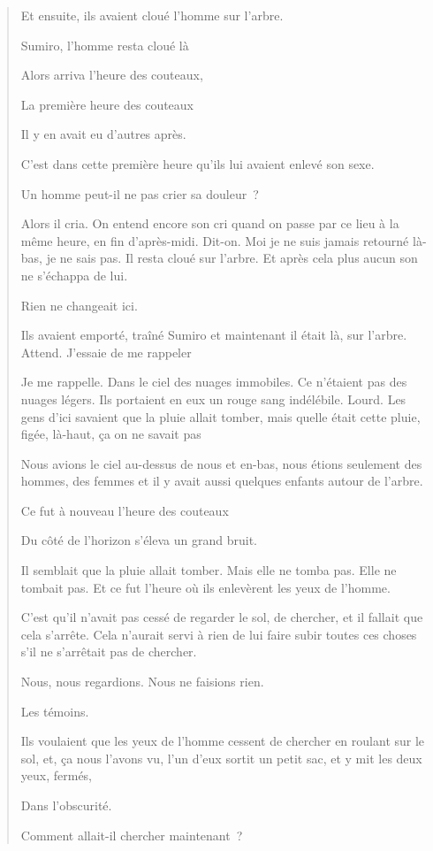 \begin{quote}
Et ensuite, ils avaient cloué l'homme sur l'arbre.

Sumiro, l'homme resta cloué là

Alors arriva l'heure des couteaux,

La première heure des couteaux

Il y en avait eu d'autres après.

C'est dans cette première heure qu'ils lui avaient enlevé son sexe.

Un homme peut-il ne pas crier sa douleur~?

Alors il cria. On entend encore son cri quand on passe par ce lieu à la
même heure, en fin d'après-midi. Dit-on. Moi je ne suis jamais retourné
là-bas, je ne sais pas. Il resta cloué sur l'arbre. Et après cela plus
aucun son ne s'échappa de lui.

Rien ne changeait ici.

Ils avaient emporté, traîné Sumiro et maintenant il était là, sur
l'arbre. Attend. J'essaie de me rappeler

Je me rappelle. Dans le ciel des nuages immobiles. Ce n'étaient pas des
nuages légers. Ils portaient en eux un rouge sang indélébile. Lourd. Les
gens d'ici savaient que la pluie allait tomber, mais quelle était cette
pluie, figée, là-haut, ça on ne savait pas

Nous avions le ciel au-dessus de nous et en-bas, nous étions seulement
des hommes, des femmes et il y avait aussi quelques enfants autour de
l'arbre.

Ce fut à nouveau l'heure des couteaux

Du côté de l'horizon s'éleva un grand bruit.

Il semblait que la pluie allait tomber. Mais elle ne tomba pas. Elle ne
tombait pas. Et ce fut l'heure où ils enlevèrent les yeux de l'homme.

C'est qu'il n'avait pas cessé de regarder le sol, de chercher, et il
fallait que cela s'arrête. Cela n'aurait servi à rien de lui faire subir
toutes ces choses s'il ne s'arrêtait pas de chercher.

Nous, nous regardions. Nous ne faisions rien.

Les témoins.

Ils voulaient que les yeux de l'homme cessent de chercher en roulant sur
le sol, et, ça nous l'avons vu, l'un d'eux sortit un petit sac, et y mit
les deux yeux, fermés,

Dans l'obscurité.

Comment allait-il chercher maintenant~?


\end{quote}
